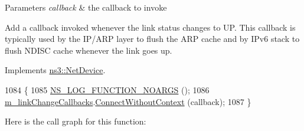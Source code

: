\begin{DoxyParams}{Parameters}
{\em callback} & the callback to invoke\\
\hline
\end{DoxyParams}
Add a callback invoked whenever the link status changes to UP. This callback is typically used by the I\+P/\+A\+RP layer to flush the A\+RP cache and by I\+Pv6 stack to flush N\+D\+I\+SC cache whenever the link goes up. 

Implements \hyperlink{classns3_1_1NetDevice_aafb1bf869d38ef7a7112d11fab0163a3}{ns3\+::\+Net\+Device}.


\begin{DoxyCode}
1084 \{
1085   \hyperlink{log-macros-disabled_8h_a8f7e4afc291c9d29a65c18ac1f79197b}{NS\_LOG\_FUNCTION\_NOARGS} ();
1086   \hyperlink{classns3_1_1TapBridge_a3c5c9f53b15fc47d55420f4905297a06}{m\_linkChangeCallbacks}.\hyperlink{classns3_1_1TracedCallback_aacc251bf4e302e7d034e9f0e25a15980}{ConnectWithoutContext} (callback);
1087 \}
\end{DoxyCode}


Here is the call graph for this function\+:


